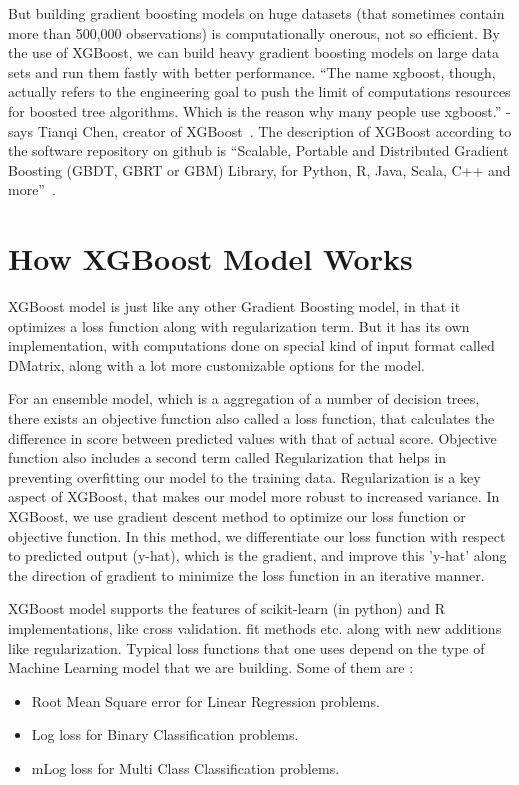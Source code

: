 But building gradient boosting models on huge datasets (that sometimes
contain more than 500,000 observations) is computationally onerous,
not so efficient.  By the use of XGBoost, we can build heavy gradient
boosting models on large data sets and run them fastly with better
performance. ``The name xgboost, though, actually refers to the
engineering goal to push the limit of computations resources for
boosted tree algorithms. Which is the reason why many people use
xgboost.'' - says Tianqi Chen, creator of
XGBoost~\cite{hid-sp18-401-XGBoost-MLmastery}. The description of
XGBoost according to the software repository on github is ``Scalable,
Portable and Distributed Gradient Boosting (GBDT, GBRT or GBM)
Library, for Python, R, Java, Scala, C++ and
more''~\cite{hid-sp18-401-XGBoost-Github}.


\section{How XGBoost Model Works}

XGBoost model is just like any other Gradient Boosting model, in that it
optimizes a loss function  along with regularization term. But it has its own
implementation, with computations done on special kind of input format called
DMatrix, along with a lot more customizable options for the model.
 
For an ensemble model, which is a aggregation of a number of decision trees,
there exists an objective function also called a loss function, that
calculates the difference in score between predicted values with that of
actual score. Objective function also includes a second term called
Regularization that helps in preventing overfitting our model to the training
data. Regularization is a key aspect of XGBoost, that makes our model more
robust to increased variance. In XGBoost, we use gradient descent method to
optimize our loss function or objective function. In this method, we
differentiate our loss function with respect to predicted output (y-hat),
which is the gradient, and improve this 'y-hat' along the direction of
gradient to minimize the loss function in an iterative manner.

XGBoost model supports the features of scikit-learn (in python) and R
implementations, like cross validation. fit methods etc. along with new
additions like regularization.  Typical loss functions that one uses depend on
the type of Machine Learning model that we are building. Some of them are :

\begin{itemize}
\item Root Mean Square error for Linear Regression problems. 
\item Log loss for Binary Classification problems. 
\item mLog loss for Multi Class Classification problems.
\end{itemize}

